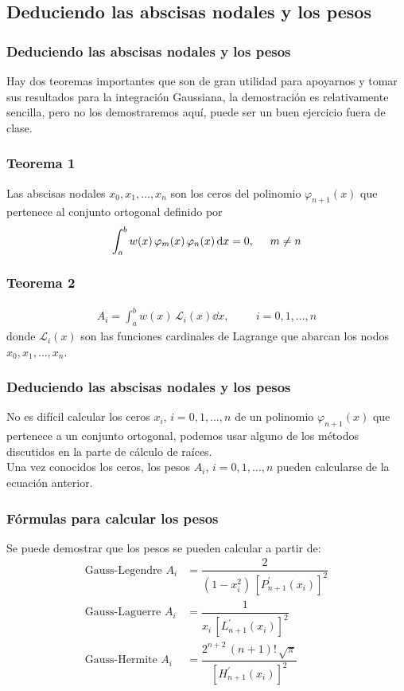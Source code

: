 \subsection{Deduciendo las abscisas nodales y los pesos}
\begin{frame}
\frametitle{Deduciendo las abscisas nodales y los pesos}
Hay dos teoremas importantes que son de gran utilidad para apoyarnos y tomar sus resultados para la integración Gaussiana, la demostración es relativamente sencilla, pero no los demostraremos aquí, puede ser un buen ejercicio fuera de clase.
\end{frame}
\begin{frame}
\frametitle{Teorema 1}
\begin{miteorema}
Las abscisas nodales $x_{0}, x_{1}, \ldots, x_{n}$ son los ceros del polinomio $\varphi_{n+1}(x)$  que pertenece al conjunto ortogonal definido por
\begin{align*}
\int_{a}^{b} w(x) \, \varphi_{m}(x) \, \varphi_{n}(x) \dd{x} = 0, \hspace{0.5cm} m \neq n
\end{align*}
\end{miteorema}
\end{frame}
\begin{frame}
\frametitle{Teorema 2}
\begin{miteorema}
\begin{align*}
A_{i} = \int_{a}^{b} w(x) \, \mathcal{L}_{i} (x) \dd{x}, \hspace{1cm} i = 0, 1, \ldots, n
\end{align*}
donde $\mathcal{L}_{i} (x)$ son las funciones cardinales de Lagrange que abarcan los nodos $x_{0}, x_{1}, \ldots, x_{n}$.
\end{miteorema}
\end{frame}
\begin{frame}
\frametitle{Deduciendo las abscisas nodales y los pesos}
No es difícil calcular los ceros $x_{i}$, $i = 0, 1, \ldots, n$ de un polinomio $\varphi_{n+1} (x)$ que pertenece a un conjunto ortogonal, podemos usar alguno de los métodos discutidos en la parte de cálculo de raíces.
\\
\bigskip
Una vez conocidos los ceros, los pesos $A_{i}$, $i = 0, 1, \ldots, n$ pueden calcularse de la ecuación anterior.
\end{frame}
\begin{frame}
\frametitle{Fórmulas para calcular los pesos}
Se puede demostrar que los pesos se pueden calcular a partir de:
\begin{align*}
\mbox{Gauss-Legendre   }  A_{i} &= \dfrac{2}{(1-x^{2}_{i}) \, \left[P^{\prime}_{n+1} (x_{i}) \right]^{2}} \\[0.5em]
\mbox{Gauss-Laguerre   } A_{i} &= \dfrac{1}{x_{i} \, \left[L^{\prime}_{n+1} (x_{i}) \right]^{2}} \\[0.5em]
\mbox{Gauss-Hermite   } A_{i} &= \dfrac{2^{n+2} \, (n+1)! \, \sqrt{\pi}}{\left[ H^{\prime}_{n+1} (x_{i}) \right]^{2}}
\end{align*}
\end{frame}
